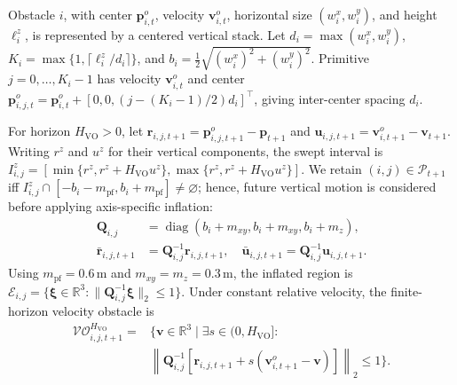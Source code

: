 \documentclass[letterpaper, 10 pt, conference]{ieeeconf}
\begin{document}
Obstacle \(i\), with center \(\mathbf{p}^{o}_{i,t}\), velocity \(\mathbf{v}^{o}_{i,t}\), horizontal size \((w_i^x,w_i^y)\), and height \(\ell_i^z\), is represented by a centered vertical stack. Let \(d_i=\max(w_i^x,w_i^y)\), \(K_i=\max\{1,\lceil\ell_i^z/d_i\rceil\}\), and \(b_i=\tfrac12\sqrt{(w_i^x)^2+(w_i^y)^2}\). Primitive \(j=0,\ldots,K_i-1\) has velocity \(\mathbf{v}^{o}_{i,t}\) and center \(\mathbf{p}^{o}_{i,j,t}=\mathbf{p}^{o}_{i,t}+[0,0,(j-(K_i-1)/2)d_i]^\top\), giving inter-center spacing \(d_i\).

For horizon \(H_{\mathrm{VO}}>0\), let \(\mathbf{r}_{i,j,t+1}=\mathbf{p}^{o}_{i,j,t+1}-\mathbf{p}_{t+1}\) and \(\mathbf{u}_{i,j,t+1}=\mathbf{v}^{o}_{i,t+1}-\mathbf{v}_{t+1}\). Writing \(r^z\) and \(u^z\) for their vertical components, the swept interval is \(I^z_{i,j}=[\min\{r^z,r^z+H_{\mathrm{VO}}u^z\},\max\{r^z,r^z+H_{\mathrm{VO}}u^z\}]\). We retain \((i,j)\in\mathcal{P}_{t+1}\) iff \(I^z_{i,j}\cap[-b_i-m_{\mathrm{pf}},b_i+m_{\mathrm{pf}}]\neq\varnothing\); hence, future vertical motion is considered before applying axis-specific inflation:
\begin{equation}
	\begin{aligned}
	\mathbf{Q}_{i,j}&=\operatorname{diag}
	(b_i+m_{xy},b_i+m_{xy},b_i+m_z),\\[-1mm]
	\bar{\mathbf{r}}_{i,j,t+1}&=\mathbf{Q}_{i,j}^{-1}\mathbf{r}_{i,j,t+1},\quad
	\bar{\mathbf{u}}_{i,j,t+1}=\mathbf{Q}_{i,j}^{-1}\mathbf{u}_{i,j,t+1}.
	\end{aligned}
	\label{eq:scaled_relative_motion}
\end{equation}
Using \(m_{\mathrm{pf}}=0.6\,\mathrm{m}\) and \(m_{xy}=m_z=0.3\,\mathrm{m}\), the inflated region is \(\mathcal{E}_{i,j}=\{\boldsymbol{\xi}\in\mathbb{R}^3:\|\mathbf{Q}_{i,j}^{-1}\boldsymbol{\xi}\|_2\leq1\}\). Under constant relative velocity, the finite-horizon velocity obstacle is
\begin{equation}
	\begin{aligned}
	\mathcal{VO}^{H_{\mathrm{VO}}}_{i,j,t+1}
	={}&\bigl\{\mathbf{v}\in\mathbb{R}^{3}\mid
	\exists s\in(0,H_{\mathrm{VO}}]:\\[-1mm]
	&\left\|\mathbf{Q}_{i,j}^{-1}\!\left[
	\mathbf{r}_{i,j,t+1}+s(\mathbf{v}^{o}_{i,t+1}-\mathbf{v})
	\right]\right\|_2\leq1\bigr\}.
	\end{aligned}
\label{eq:finite_vo}
\end{equation}
\end{document}
